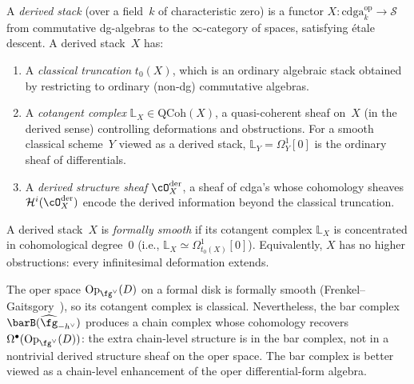 \begin{definition}
\label{def:derived-stack}
A \emph{derived stack} (over a field~$k$ of characteristic zero) is
a functor
$X\colon \mathrm{cdga}_k^{\mathrm{op}} \to \mathcal{S}$
from commutative dg-algebras to the $\infty$-category of spaces,
satisfying \'etale descent. A derived stack~$X$ has:
\begin{enumerate}[label=\textup{(\roman*)}]
\item A \emph{classical truncation} $t_0(X)$, which is an ordinary
 algebraic stack obtained by restricting to ordinary (non-dg)
 commutative algebras.
\item A \emph{cotangent complex} $\mathbb{L}_X \in \mathrm{QCoh}(X)$,
 a quasi-coherent sheaf on~$X$ (in the derived sense) controlling
 deformations and obstructions. For a smooth classical
 scheme~$Y$ viewed as a derived stack, $\mathbb{L}_Y = \Omega^1_Y[0]$
 is the ordinary sheaf of differentials.
\item A \emph{derived structure sheaf} $\cO_X^{\mathrm{der}}$,
 a sheaf of cdga's whose cohomology sheaves
 $\mathcal{H}^i(\cO_X^{\mathrm{der}})$ encode the derived
 information beyond the classical truncation.
\end{enumerate}
\end{definition}

\begin{definition}
\label{def:formal-smoothness}
A derived stack~$X$ is \emph{formally smooth} if its cotangent
complex $\mathbb{L}_X$ is concentrated in cohomological degree~$0$
(i.e., $\mathbb{L}_X \simeq \Omega^1_{t_0(X)}[0]$). Equivalently,
$X$ has no higher obstructions: every infinitesimal deformation
extends.
\end{definition}

\begin{remark}
\label{rem:formal-smooth-derived}
The oper space $\mathrm{Op}_{\fg^\vee}(D)$ on a formal disk is
formally smooth (Frenkel--Gaitsgory~\cite{FG06}), so its cotangent
complex is classical. Nevertheless, the bar complex
$\barB(\widehat{\fg}_{-h^\vee})$ produces a chain complex
whose cohomology recovers
$\Omega^\bullet(\mathrm{Op}_{\fg^\vee}(D))$: the extra chain-level
structure is in the bar complex, not in a nontrivial derived
structure sheaf on the oper space. The bar complex is better viewed
as a chain-level enhancement of the oper differential-form algebra.
\end{remark}


